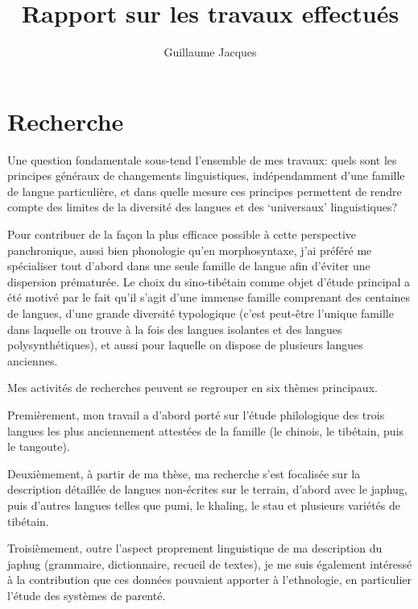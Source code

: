 \documentclass[oldfontcommands,oneside,a4paper,11pt]{article}
\begin{document}
\title{Rapport sur les travaux effectués}
\author{Guillaume Jacques}
\maketitle

\sloppy

\tableofcontents

\section{Recherche}
Une question fondamentale sous-tend l'ensemble de mes travaux: quels sont les principes généraux de changements linguistiques, indépendamment d'une famille de langue particulière, et dans quelle mesure  ces principes permettent de rendre compte des limites de la diversité des langues et des `universaux' linguistiques?

Pour contribuer de la façon la plus efficace possible à cette perspective panchronique,  aussi bien phonologie qu'en morphosyntaxe, j'ai préféré me spécialiser tout d'abord dans une seule famille de langue afin d'éviter une dispersion prématurée. Le choix du sino-tibétain comme objet d'étude principal a été motivé par le fait qu'il s'agit d'une immense famille comprenant des centaines de langues, d'une grande diversité typologique (c'est peut-être l'unique famille dans laquelle on trouve à la fois des langues isolantes et des langues polysynthétiques), et aussi pour laquelle on dispose de plusieurs langues anciennes.

Mes activités de recherches peuvent se regrouper en six thèmes principaux.

Premièrement, mon travail a d'abord porté sur l'étude philologique des trois langues les plus anciennement attestées de la famille (le chinois, le tibétain, puis le tangoute). 

Deuxièmement, à partir de ma thèse, ma recherche s'est focalisée sur la description détaillée de langues non-écrites sur le terrain, d'abord avec le japhug, puis d'autres langues telles que pumi, le khaling, le stau et plusieurs variétés de tibétain. 

Troisièmement, outre l'aspect proprement linguistique de ma description du japhug (grammaire, dictionnaire, recueil de textes), je me suis également intéressé à la contribution que ces données pouvaient apporter à l'ethnologie, en particulier l'étude des systèmes de parenté.
\end{document}
